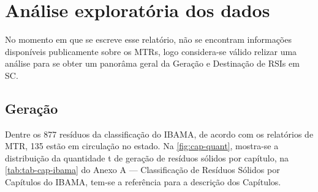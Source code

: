 \begin{table}[htb]
    \ABNTEXfontereduzida
    \centering
    \caption{Amostra da estrutura de dados pós cruzamento. \label{tab:Tab_demo2} }
\end{table}


\section{Análise exploratória dos dados}

No momento em que se escreve esse relatório, não se encontram informações disponíveis publicamente sobre os \gls{MTR}s, logo considera-se válido relizar uma análise para se obter um panorâma geral da Geração e Destinação de \gls{RSI}s em \gls{SC}. 

\subsection{Geração}

Dentre os 877 resíduos da classificação do \gls{IBAMA}, de acordo com os relatórios de \gls{MTR}, 135 estão em circulação no estado. Na \autoref{fig:cap-quant}, mostra-se a distribuição da quantidade \gls{t} de geração de resíduos sólidos por capítulo, na \autoref{tab:tab-cap-ibama} do Anexo A — Classificação de Resíduos Sólidos por Capítulos do IBAMA, tem-se a referência para a descrição dos Capítulos.


